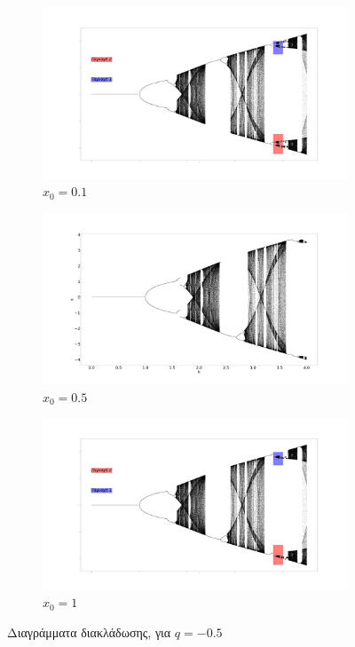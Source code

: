 \begin{figure}[ht]
	\centering
	\begin{subfigure}[b]{0.8\textwidth}
		\centering
		\includegraphics[width=\textwidth]{LateX images/sine q=-0.5/g4}
		\caption{\(x_0=0.1\)}
		\label{f:g46}
	\end{subfigure}
	\hfill
	\begin{subfigure}[b]{0.8\textwidth}
		\centering
		\includegraphics[width=\textwidth]{LateX images/sine q=-0.5/g5}
		\caption{\(x_0=0.5\)}
		\label{f:g47}
	\end{subfigure}
	\hfill
	\begin{subfigure}[b]{0.8\textwidth}
		\centering
		\includegraphics[width=\textwidth]{LateX images/sine q=-0.5/g6}
		\caption{\(x_0=1\)}
		\label{f:g48}
	\end{subfigure}
	\caption{ Διαγράμματα διακλάδωσης, για $q=-0.5$}
	\label{f:48}
\end{figure}

